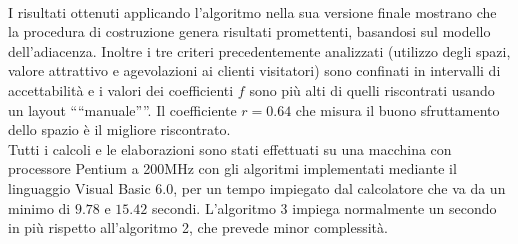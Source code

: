 \documentclass[12pt,a4paper,openright,twoside]{report}
\begin{document}
\\I risultati ottenuti applicando l'algoritmo nella sua versione finale mostrano che la procedura di costruzione genera risultati promettenti, basandosi sul modello dell'adiacenza. Inoltre i tre criteri precedentemente analizzati (utilizzo degli spazi, valore attrattivo e agevolazioni ai clienti visitatori) sono confinati in intervalli di accettabilit\`{a} e i valori dei coefficienti $f$ sono pi\`{u} alti di quelli riscontrati usando un layout "`"`manuale"'"'. Il coefficiente $r = 0.64$ che misura il buono sfruttamento dello spazio \`{e} il migliore riscontrato.\\
Tutti i calcoli e le elaborazioni sono stati effettuati su una macchina con processore Pentium a 200MHz con gli algoritmi implementati mediante il linguaggio Visual Basic 6.0, per un tempo impiegato dal calcolatore che va da un minimo di $9.78$ e $15.42$ secondi. L'algoritmo 3 impiega normalmente un secondo in pi\`{u} rispetto all'algoritmo 2, che prevede minor complessit\`{a}.\\ 
\end{document}
